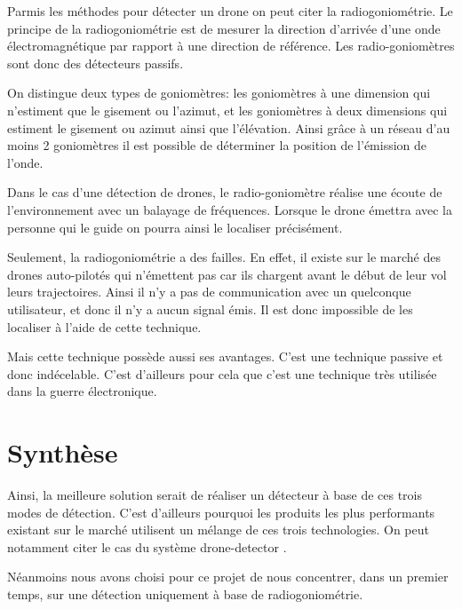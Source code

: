Parmis les méthodes pour détecter un drone on peut citer la radiogoniométrie. Le principe de la radiogoniométrie est de mesurer la direction d'arrivée d'une onde électromagnétique par rapport à une direction de référence. Les radio-goniomètres sont donc des détecteurs passifs. 

On distingue deux types de goniomètres: les goniomètres à une dimension qui n'estiment que le gisement ou l'azimut, et les goniomètres à deux dimensions qui estiment le gisement ou azimut ainsi que l'élévation. Ainsi grâce à un réseau d'au moins 2 goniomètres il est possible de déterminer la position de l'émission de l'onde.


Dans le cas d'une détection de drones, le radio-goniomètre réalise une écoute de l'environnement avec un balayage de fréquences. Lorsque le drone émettra avec la personne qui le guide on pourra ainsi le localiser précisément.

Seulement, la radiogoniométrie a des failles. En effet, il existe sur le marché des drones auto-pilotés qui n'émettent pas car ils chargent avant le début de leur vol leurs trajectoires. Ainsi il n'y a pas de communication avec un quelconque utilisateur, et donc il n'y a aucun signal émis. Il est donc impossible de les localiser à l'aide de cette technique.

Mais cette technique possède aussi ses avantages. C'est une technique passive et donc indécelable. C'est d'ailleurs pour cela que c'est une technique très utilisée dans la guerre électronique. 





\section{Synthèse}

Ainsi, la meilleure solution serait de réaliser un détecteur à base de ces trois modes de détection. C'est d'ailleurs pourquoi les produits les plus performants existant sur le marché utilisent un mélange de ces trois technologies. On peut notamment citer le cas du système drone-detector \cite{dronedetector}.

Néanmoins nous avons choisi pour ce projet de nous concentrer, dans un premier temps, sur une détection uniquement à base de radiogoniométrie.


